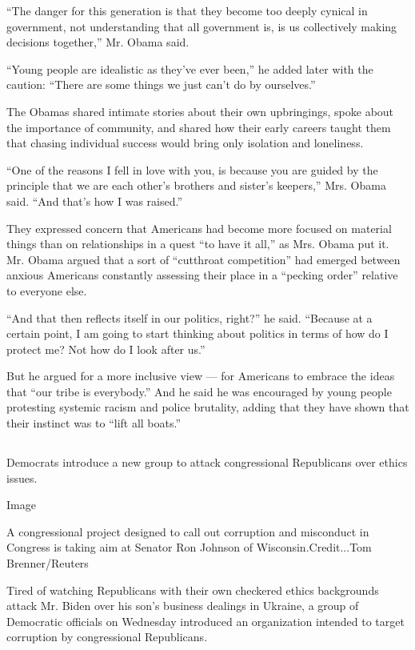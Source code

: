 ``The danger for this generation is that they become too deeply cynical
in government, not understanding that all government is, is us
collectively making decisions together,'' Mr. Obama said.

``Young people are idealistic as they've ever been,'' he added later
with the caution: ``There are some things we just can't do by
ourselves.''

The Obamas shared intimate stories about their own upbringings, spoke
about the importance of community, and shared how their early careers
taught them that chasing individual success would bring only isolation
and loneliness.

``One of the reasons I fell in love with you, is because you are guided
by the principle that we are each other's brothers and sister's
keepers,'' Mrs. Obama said. ``And that's how I was raised.''

They expressed concern that Americans had become more focused on
material things than on relationships in a quest ``to have it all,'' as
Mrs. Obama put it. Mr. Obama argued that a sort of ``cutthroat
competition'' had emerged between anxious Americans constantly assessing
their place in a ``pecking order'' relative to everyone else.

``And that then reflects itself in our politics, right?'' he said.
``Because at a certain point, I am going to start thinking about
politics in terms of how do I protect me? Not how do I look after us.''

But he argued for a more inclusive view --- for Americans to embrace the
ideas that ``our tribe is everybody.'' And he said he was encouraged by
young people protesting systemic racism and police brutality, adding
that they have shown that their instinct was to ``lift all boats.''

\hypertarget{-7}{%
\subsection{}\label{-7}}

Democrats introduce a new group to attack congressional Republicans over
ethics issues.

Image

A congressional project designed to call out corruption and misconduct
in Congress is taking aim at Senator Ron Johnson of
Wisconsin.Credit...Tom Brenner/Reuters

Tired of watching Republicans with their own checkered ethics
backgrounds attack Mr. Biden over his son's business dealings in
Ukraine, a group of Democratic officials on Wednesday introduced an
organization intended to target corruption by congressional Republicans.

